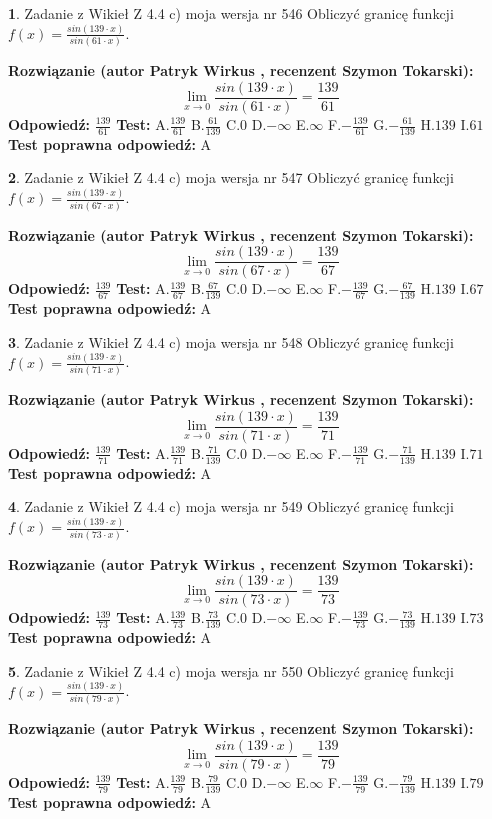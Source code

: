 \documentclass[12pt, a4paper]{article}
\theoremstyle{definition} %
\newtheorem{zad}{}
\newcommand{\zadStart}[1]{\begin{zad}#1\newline}
\newcommand{\zadStop}{\end{zad}}
\newcommand{\rozwStart}[2]{\noindent \textbf{Rozwiązanie (autor #1 , recenzent #2): }\newline}
\newcommand{\rozwStop}{\newline}
\newcommand{\odpStart}{\noindent \textbf{Odpowiedź:}\newline}
\newcommand{\odpStop}{\newline}
\newcommand{\testStart}{\noindent \textbf{Test:}\newline}
\newcommand{\testStop}{\newline}
\newcommand{\kluczStart}{\noindent \textbf{Test poprawna odpowiedź:}\newline}
\newcommand{\kluczStop}{\newline}
\begin{document}
\zadStart{Zadanie z Wikieł Z 4.4 c) moja wersja nr 546}
Obliczyć granicę funkcji $f(x)=\frac{sin(139\cdot x)}{sin(61\cdot x)}$.
\zadStop
\rozwStart{Patryk Wirkus}{Szymon Tokarski}
$$\lim\limits_{x\to 0}\frac{sin(139\cdot x)}{sin(61\cdot x)}=
\frac{139}{61}$$
\rozwStop
\odpStart
$\frac{139}{61}$
\odpStop
\testStart
A.$\frac{139}{61}$
B.$\frac{61}{139}$
C.$0$
D.$-\infty$
E.$\infty$
F.$-\frac{139}{61}$
G.$-\frac{61}{139}$
H.$139$
I.$61$
\testStop
\kluczStart
A
\kluczStop



\zadStart{Zadanie z Wikieł Z 4.4 c) moja wersja nr 547}
Obliczyć granicę funkcji $f(x)=\frac{sin(139\cdot x)}{sin(67\cdot x)}$.
\zadStop
\rozwStart{Patryk Wirkus}{Szymon Tokarski}
$$\lim\limits_{x\to 0}\frac{sin(139\cdot x)}{sin(67\cdot x)}=
\frac{139}{67}$$
\rozwStop
\odpStart
$\frac{139}{67}$
\odpStop
\testStart
A.$\frac{139}{67}$
B.$\frac{67}{139}$
C.$0$
D.$-\infty$
E.$\infty$
F.$-\frac{139}{67}$
G.$-\frac{67}{139}$
H.$139$
I.$67$
\testStop
\kluczStart
A
\kluczStop



\zadStart{Zadanie z Wikieł Z 4.4 c) moja wersja nr 548}
Obliczyć granicę funkcji $f(x)=\frac{sin(139\cdot x)}{sin(71\cdot x)}$.
\zadStop
\rozwStart{Patryk Wirkus}{Szymon Tokarski}
$$\lim\limits_{x\to 0}\frac{sin(139\cdot x)}{sin(71\cdot x)}=
\frac{139}{71}$$
\rozwStop
\odpStart
$\frac{139}{71}$
\odpStop
\testStart
A.$\frac{139}{71}$
B.$\frac{71}{139}$
C.$0$
D.$-\infty$
E.$\infty$
F.$-\frac{139}{71}$
G.$-\frac{71}{139}$
H.$139$
I.$71$
\testStop
\kluczStart
A
\kluczStop



\zadStart{Zadanie z Wikieł Z 4.4 c) moja wersja nr 549}
Obliczyć granicę funkcji $f(x)=\frac{sin(139\cdot x)}{sin(73\cdot x)}$.
\zadStop
\rozwStart{Patryk Wirkus}{Szymon Tokarski}
$$\lim\limits_{x\to 0}\frac{sin(139\cdot x)}{sin(73\cdot x)}=
\frac{139}{73}$$
\rozwStop
\odpStart
$\frac{139}{73}$
\odpStop
\testStart
A.$\frac{139}{73}$
B.$\frac{73}{139}$
C.$0$
D.$-\infty$
E.$\infty$
F.$-\frac{139}{73}$
G.$-\frac{73}{139}$
H.$139$
I.$73$
\testStop
\kluczStart
A
\kluczStop



\zadStart{Zadanie z Wikieł Z 4.4 c) moja wersja nr 550}
Obliczyć granicę funkcji $f(x)=\frac{sin(139\cdot x)}{sin(79\cdot x)}$.
\zadStop
\rozwStart{Patryk Wirkus}{Szymon Tokarski}
$$\lim\limits_{x\to 0}\frac{sin(139\cdot x)}{sin(79\cdot x)}=
\frac{139}{79}$$
\rozwStop
\odpStart
$\frac{139}{79}$
\odpStop
\testStart
A.$\frac{139}{79}$
B.$\frac{79}{139}$
C.$0$
D.$-\infty$
E.$\infty$
F.$-\frac{139}{79}$
G.$-\frac{79}{139}$
H.$139$
I.$79$
\testStop
\kluczStart
A
\kluczStop
\end{document}
